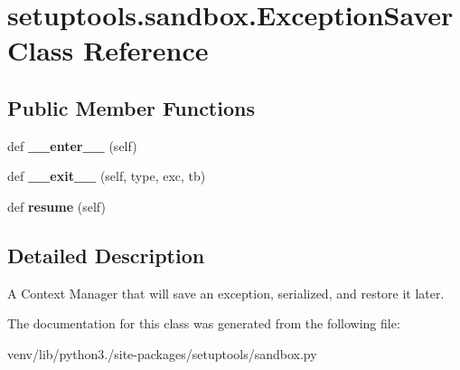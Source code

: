 \hypertarget{classsetuptools_1_1sandbox_1_1_exception_saver}{}\section{setuptools.\+sandbox.\+Exception\+Saver Class Reference}
\label{classsetuptools_1_1sandbox_1_1_exception_saver}
\subsection*{Public Member Functions}
\begin{DoxyCompactItemize}
\item 
\mbox{\label{classsetuptools_1_1sandbox_1_1_exception_saver_ad082d945975f60464d10fc094badb716}} 
def {\bfseries \+\_\+\+\_\+enter\+\_\+\+\_\+} (self)
\item 
\mbox{\label{classsetuptools_1_1sandbox_1_1_exception_saver_adb9641f6636f79990953e8e801042e48}} 
def {\bfseries \+\_\+\+\_\+exit\+\_\+\+\_\+} (self, type, exc, tb)
\item 
\mbox{\label{classsetuptools_1_1sandbox_1_1_exception_saver_a15ad2160616d79097aeb70eb725a0172}} 
def {\bfseries resume} (self)
\end{DoxyCompactItemize}


\subsection{Detailed Description}
\begin{DoxyVerb}A Context Manager that will save an exception, serialized, and restore it
later.
\end{DoxyVerb}
 

The documentation for this class was generated from the following file\+:\begin{DoxyCompactItemize}
\item 
venv/lib/python3./site-\/packages/setuptools/sandbox.\+py\end{DoxyCompactItemize}
